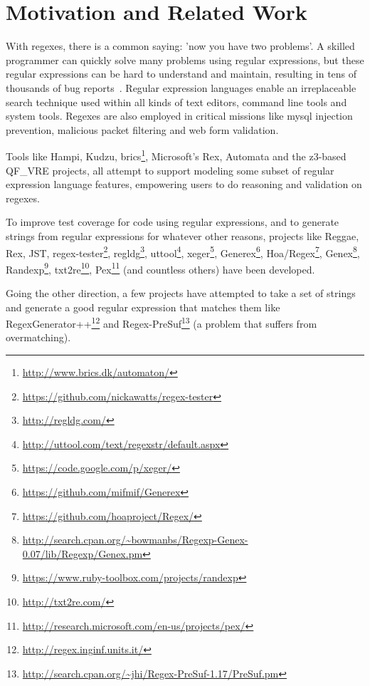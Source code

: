 \section{Motivation and Related Work}
\label{sec:motivation}

With regexes, there is a common saying: 'now you have two problems'.
A skilled programmer can quickly solve many problems using regular expressions, but these regular expressions can be hard to understand and maintain, resulting in tens of thousands of bug reports~\cite{Spishak:2012:TSR:2318202.2318207}.
Regular expression languages enable an irreplaceable search technique used within all kinds of text editors, command line tools and system tools.
Regexes are also employed in critical missions like mysql injection prevention, malicious packet filtering  and web form validation.

Tools like Hampi, Kudzu, brics\footnote{\url{http://www.brics.dk/automaton/}}, Microsoft's Rex, Automata and the z3-based QF\_VRE projects, all attempt to support modeling some subset of regular expression language features, empowering users to do reasoning and validation on regexes.

To improve test coverage for code using regular expressions, and to generate strings from regular expressions for whatever other reasons, projects like Reggae, Rex, JST, regex-tester\footnote{\url{https://github.com/nickawatts/regex-tester}}, regldg\footnote{\url{http://regldg.com/}},
uttool\footnote{\url{http://uttool.com/text/regexstr/default.aspx}}, xeger\footnote{\url{https://code.google.com/p/xeger/}}, Generex\footnote{\url{https://github.com/mifmif/Generex}}, Hoa/Regex\footnote{\url{https://github.com/hoaproject/Regex/}}, Genex\footnote{\url{http://search.cpan.org/~bowmanbs/Regexp-Genex-0.07/lib/Regexp/Genex.pm}}, Randexp\footnote{\url{https://www.ruby-toolbox.com/projects/randexp}}, txt2re\footnote{\url{http://txt2re.com/}}, Pex\footnote{\url{http://research.microsoft.com/en-us/projects/pex/}} (and countless others) have been developed.

Going the other direction, a few projects have attempted to take a set of strings and generate a good regular expression that matches them like RegexGenerator++\footnote{\url{http://regex.inginf.units.it/}} and Regex-PreSuf\footnote{\url{http://search.cpan.org/~jhi/Regex-PreSuf-1.17/PreSuf.pm}} (a problem that suffers from overmatching).

